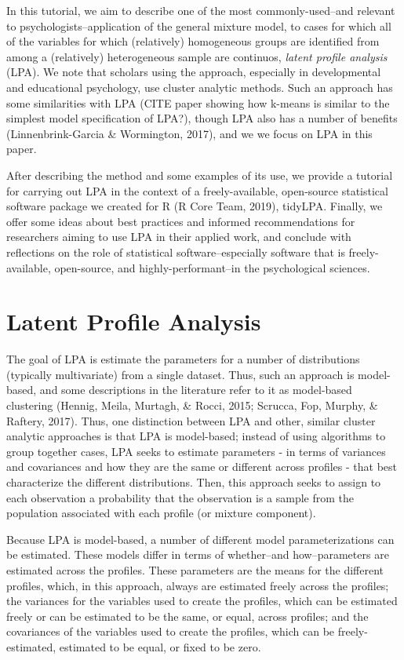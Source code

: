 \documentclass[man]{apa6}
\begin{document}
In this tutorial, we aim to describe one of the most commonly-used--and relevant
to psychologists--application of the general mixture model, to cases for which
all of the variables for which (relatively) homogeneous groups are identified
from among a (relatively) heterogeneous sample are continuos, \emph{latent profile
analysis} (LPA). We note that scholars using the approach, especially in
developmental and educational psychology, use cluster analytic methods. Such an
approach has some similarities with LPA (CITE paper showing how k-means is
similar to the simplest model specification of LPA?), though LPA also has a
number of benefits (Linnenbrink-Garcia \& Wormington, 2017), and we we focus on
LPA in this paper.

After describing the method and some examples of its use, we provide a tutorial
for carrying out LPA in the context of a freely-available, open-source
statistical software package we created for R (R Core Team, 2019), tidyLPA.
Finally, we offer some ideas about best practices and informed recommendations
for researchers aiming to use LPA in their applied work, and conclude with
reflections on the role of statistical software--especially software that is
freely-available, open-source, and highly-performant--in the psychological
sciences.

\hypertarget{latent-profile-analysis}{%
\section{Latent Profile Analysis}\label{latent-profile-analysis}}

The goal of LPA is estimate the parameters for a number of distributions
(typically multivariate) from a single dataset. Thus, such an approach is
model-based, and some descriptions in the literature refer to it as model-based
clustering (Hennig, Meila, Murtagh, \& Rocci, 2015; Scrucca, Fop, Murphy, \&
Raftery, 2017). Thus, one distinction between LPA and other, similar cluster
analytic approaches is that LPA is model-based; instead of using algorithms to
group together cases, LPA seeks to estimate parameters - in terms of variances
and covariances and how they are the same or different across profiles - that
best characterize the different distributions. Then, this approach seeks to
assign to each observation a probability that the observation is a sample from
the population associated with each profile (or mixture component).

Because LPA is model-based, a number of different model parameterizations can be
estimated. These models differ in terms of whether--and how--parameters are
estimated across the profiles. These parameters are the means for the different
profiles, which, in this approach, always are estimated freely across the
profiles; the variances for the variables used to create the profiles, which can
be estimated freely or can be estimated to be the same, or equal, across
profiles; and the covariances of the variables used to create the profiles,
which can be freely-estimated, estimated to be equal, or fixed to be zero.
\end{document}
